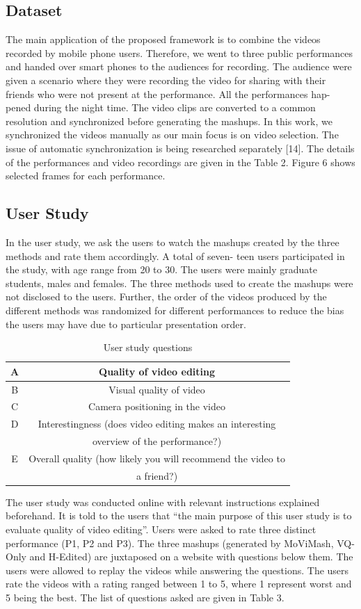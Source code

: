\documentclass{clsfile}
\begin{document}
\subsection{Dataset}
The main application of the proposed framework is to combine
the videos recorded by mobile phone users. Therefore, we went to
three public performances and handed over smart phones to the audiences for recording. The audience were given a scenario where
they were recording the video for sharing with their friends who
were not present at the performance. All the performances hap-
pened during the night time. The video clips are converted to a
common resolution and synchronized before generating the mashups.
In this work, we synchronized the videos manually as our main focus is on video selection. The issue of automatic synchronization is
being researched separately [14]. The details of the performances
and video recordings are given in the Table 2. Figure 6 shows selected frames for each performance.

\subsection{User Study}
In the user study, we ask the users to watch the mashups created
by the three methods and rate them accordingly. A total of seven-
teen users participated in the study, with age range from 20 to 30.
The users were mainly graduate students, males and females. The
three methods used to create the mashups were not disclosed to the
users. Further, the order of the videos produced by the different
methods was randomized for different performances to reduce the
bias the users may have due to particular presentation order.
\begin{table}
\centering
\caption{ User study questions}
\begin{tabular}{c|c} \hline
A & Quality of video editing \\ \hline
B& Visual quality of video \\ \hline
C& Camera positioning in the video \\ \hline
D& Interestingness (does video editing makes an interesting\\
&overview of the performance?)\\ \hline
E& Overall quality (how likely you will recommend the video to\\
&a friend?)\\
\hline\end{tabular}
\end{table}
The user study was conducted online with relevant instructions
explained beforehand. It is told to the users that “the main purpose
of this user study is to evaluate quality of video editing”. Users
were asked to rate three distinct performance (P1, P2 and P3). The
three mashups (generated by MoViMash, VQ-Only and H-Edited)
are juxtaposed on a website with questions below them. The users were allowed to replay the videos while answering the questions.
The users rate the videos with a rating ranged between 1 to 5, where
1 represent worst and 5 being the best. The list of questions asked
are given in Table 3.
\end{document}
